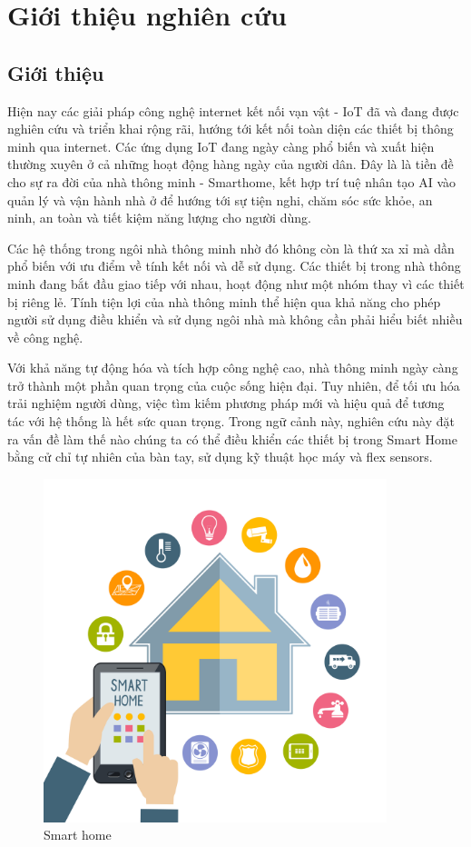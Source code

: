 \section{Giới thiệu nghiên cứu}

\subsection{Giới thiệu}

\indent Hiện nay các giải pháp công nghệ internet kết nối vạn vật - IoT đã và đang được nghiên cứu và triển khai rộng rãi, hướng tới kết nối toàn diện các thiết bị thông minh qua internet. Các ứng dụng IoT đang ngày càng phổ biến và xuất hiện thường xuyên ở cả những hoạt động hàng ngày của người dân. Đây là là tiền đề cho sự ra đời của nhà thông minh - Smarthome, kết hợp trí tuệ nhân tạo AI vào quản lý và vận hành nhà ở để hướng tới sự tiện nghi, chăm sóc sức khỏe, an ninh, an toàn và tiết kiệm năng lượng cho người dùng.

\indent Các hệ thống trong ngôi nhà thông minh nhờ đó không còn là thứ xa xỉ mà dần phổ biến với ưu điểm về tính kết nối và dễ sử dụng. Các thiết bị trong nhà thông minh đang bắt đầu giao tiếp với nhau, hoạt động như một nhóm thay vì các thiết bị riêng lẻ. Tính tiện lợi của nhà thông minh thể hiện qua khả năng cho phép người sử dụng điều khiển và sử dụng ngôi nhà mà không cần phải hiểu biết nhiều về công nghệ.

\indent Với khả năng tự động hóa và tích hợp công nghệ cao, nhà thông minh ngày càng trở thành một phần quan trọng của cuộc sống hiện đại. Tuy nhiên, để tối ưu hóa trải nghiệm người dùng, việc tìm kiếm phương pháp mới và hiệu quả để tương tác với hệ thống là hết sức quan trọng. Trong ngữ cảnh này, nghiên cứu này đặt ra vấn đề làm thế nào chúng ta có thể điều khiển các thiết bị trong Smart Home bằng cử chỉ tự nhiên của bàn tay, sử dụng kỹ thuật học máy và flex sensors.

\begin{figure}[H]
    \centering
    \includegraphics[width=10cm]{Images/Description/smarthome.jpg}
\caption{Smart home}
\end{figure}

